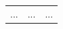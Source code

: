 \documentclass[8pt,xcolor=table,aspectratio=169]{beamer}
\begin{document}
\begin{frame}
\begin{columns}[t]
\begin{column}[t]{0.4\textwidth}
\begin{figure}
\begin{table}
\begin{tabular}{l|c|c}
                           ...          &       ... &   ...      \\



\end{tabular}
\end{table}
\end{figure}
\end{column}
\end{columns}
\end{frame}
\end{document}
